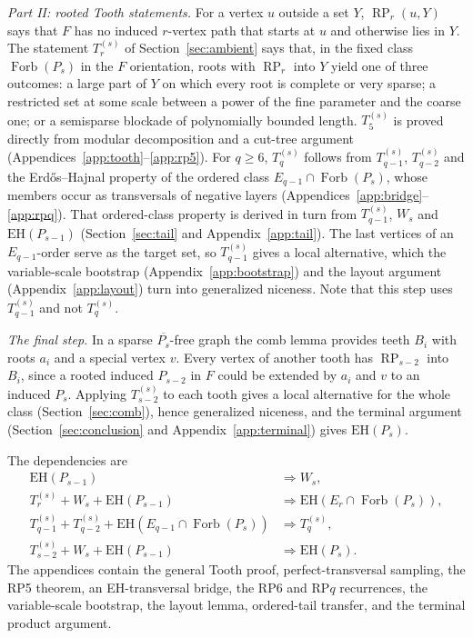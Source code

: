 \documentclass[11pt,a4paper]{article}
\theoremstyle{definition}
\theoremstyle{remark}
\numberwithin{equation}{section}
\DeclareMathOperator{\Forb}{Forb}
\DeclareMathOperator{\RP}{RP}
\newcommand{\EH}{\mathrm{EH}}
\begin{document}
\emph{Part II: rooted Tooth statements.} For a vertex \(u\) outside a set \(Y\), \(\RP_r(u,Y)\) says that \(F\) has no induced \(r\)-vertex path that starts at \(u\) and otherwise lies in \(Y\). The statement \(T_r^{(s)}\) of Section~\ref{sec:ambient} says that, in the fixed class \(\Forb(P_s)\) in the \(F\) orientation, roots with \(\RP_r\) into \(Y\) yield one of three outcomes: a large part of \(Y\) on which every root is complete or very sparse; a restricted set at some scale between a power of the fine parameter and the coarse one; or a semisparse blockade of polynomially bounded length. \(T_5^{(s)}\) is proved directly from modular decomposition and a cut-tree argument (Appendices~\ref{app:tooth}--\ref{app:rp5}). For \(q\ge6\), \(T_q^{(s)}\) follows from \(T_{q-1}^{(s)}\), \(T_{q-2}^{(s)}\) and the Erd\H{o}s--Hajnal property of the ordered class \(E_{q-1}\cap\Forb(P_s)\), whose members occur as transversals of negative layers (Appendices~\ref{app:bridge}--\ref{app:rpq}). That ordered-class property is derived in turn from \(T_{q-1}^{(s)}\), \(W_s\) and \(\EH(P_{s-1})\) (Section~\ref{sec:tail} and Appendix~\ref{app:tail}). The last vertices of an \(E_{q-1}\)-order serve as the target set, so \(T_{q-1}^{(s)}\) gives a local alternative, which the variable-scale bootstrap (Appendix~\ref{app:bootstrap}) and the layout argument (Appendix~\ref{app:layout}) turn into generalized niceness. Note that this step uses \(T_{q-1}^{(s)}\) and not \(T_q^{(s)}\).

\emph{The final step.} In a sparse \(\overline{P_s}\)-free graph the comb lemma provides teeth \(B_i\) with roots \(a_i\) and a special vertex \(v\). Every vertex of another tooth has \(\RP_{s-2}\) into \(B_i\), since a rooted induced \(P_{s-2}\) in \(F\) could be extended by \(a_i\) and \(v\) to an induced \(P_s\). Applying \(T_{s-2}^{(s)}\) to each tooth gives a local alternative for the whole class (Section~\ref{sec:comb}), hence generalized niceness, and the terminal argument (Section~\ref{sec:conclusion} and Appendix~\ref{app:terminal}) gives \(\EH(P_s)\).

The dependencies are
\begin{align*}
\EH(P_{s-1})&\Longrightarrow W_s,\\
T_r^{(s)}+W_s+\EH(P_{s-1})
 &\Longrightarrow \EH(E_r\cap\Forb(P_s)),\\
T_{q-1}^{(s)}+T_{q-2}^{(s)}+\EH(E_{q-1}\cap\Forb(P_s))
 &\Longrightarrow T_q^{(s)},\\
T_{s-2}^{(s)}+W_s+\EH(P_{s-1})
 &\Longrightarrow \EH(P_s).
\end{align*}
The appendices contain the general Tooth proof, perfect-transversal sampling, the RP5 theorem, an EH-transversal bridge, the RP6 and RP\(q\) recurrences, the variable-scale bootstrap, the layout lemma, ordered-tail transfer, and the terminal product argument.
\end{document}
